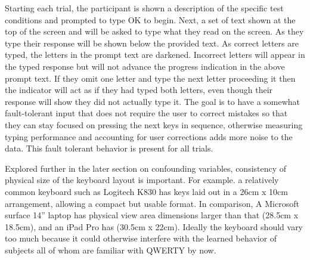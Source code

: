 \documentclass[english]{vgtc}
\begin{document}
Starting each trial, the participant is shown a description of the specific
test conditions and prompted to type OK to begin.  Next, a set of text shown at 
the top of the screen and will be asked to type what they read on the screen. 
As they type their response will be shown below the provided text. As correct
letters are typed, the letters in the prompt text are darkened. Incorrect letters
will appear in the typed response but will not advance the progress indication
in the above prompt text.  If they omit one letter and type the next letter proceeding it
then the indicator will act as if they had typed both letters, even though their response
will show they did not actually type it.  The goal is to have a somewhat
fault-tolerant input that does not require the user to correct mistakes so
that they can stay focused on pressing the next keys in sequence, otherwise
measuring typing performance and accounting for user corrections adds
more noise to the data. This fault tolerant behavior is present
for all trials. 

Explored further in the later section on confounding
variables, consistency of physical size of the keyboard layout is
important. For example. a relatively common keyboard such as Logitech K830 
has keys laid out in a 26cm x 10cm arrangement, allowing a compact but usable format. 
In comparison, A Microsoft surface
14\textquotedblright{} laptop has physical view area dimensions larger
than that (28.5cm x 18.5cm), and an iPad Pro has (30.5cm x 22cm).
Ideally the keyboard should vary too much because it could otherwise interfere with
the learned behavior of subjects all of whom are familiar with QWERTY by now.
\end{document}
